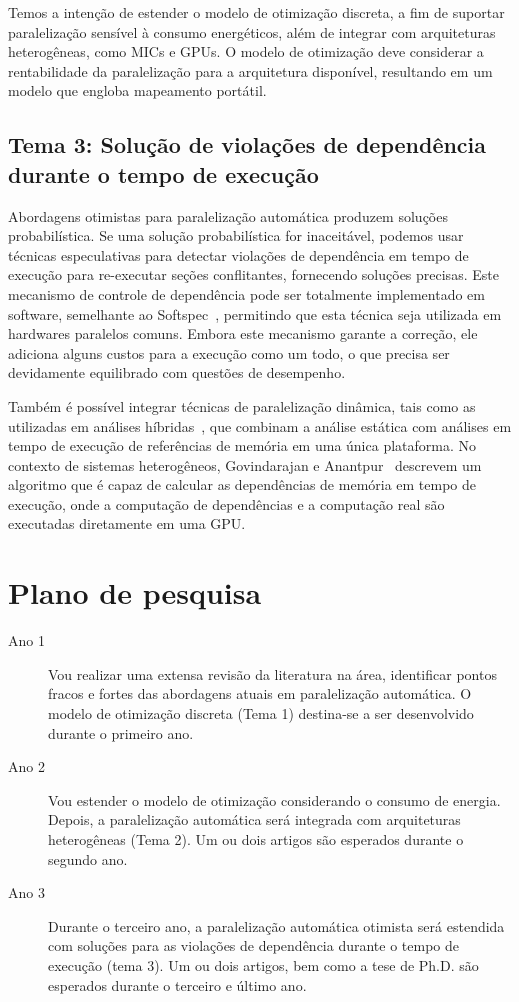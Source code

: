 \documentclass[a4paper,12pt]{article}
\begin{document}
Temos a intenção de estender o modelo de otimização discreta, a fim de suportar paralelização sensível à consumo energéticos, além de integrar com arquiteturas heterogêneas, como MICs e GPUs. O modelo de otimização deve considerar a rentabilidade da paralelização para a arquitetura disponível, resultando em um modelo que engloba mapeamento portátil.

\subsection{Tema 3: Solução de violações de dependência durante o tempo de execução}

Abordagens otimistas para paralelização automática produzem soluções probabilística. Se uma solução probabilística for inaceitável, podemos usar técnicas especulativas para detectar violações de dependência em tempo de execução para re-executar seções conflitantes, fornecendo soluções precisas. Este mecanismo de controle de dependência pode ser totalmente implementado em software, semelhante ao Softspec~\cite{bruening98}, permitindo que esta técnica seja utilizada em hardwares paralelos comuns. Embora este mecanismo garante a correção, ele adiciona alguns custos para a execução como um todo, o que precisa ser devidamente equilibrado com questões de desempenho.

Também é possível integrar técnicas de paralelização dinâmica, tais como as utilizadas em análises híbridas~\cite{rus03}, que combinam a análise estática com análises em tempo de execução de referências de memória em uma única plataforma. No contexto de sistemas heterogêneos, Govindarajan e Anantpur~\cite{govindarajan13} descrevem um algoritmo que é capaz de calcular as dependências de memória em tempo de execução, onde a computação de dependências e a computação real são executadas diretamente em uma GPU.

\section{Plano de pesquisa}

\begin{description}

\item[Ano 1] Vou realizar uma extensa revisão da literatura na área, identificar pontos fracos e fortes das abordagens atuais em paralelização automática. O modelo de otimização discreta (Tema 1) destina-se a ser desenvolvido durante o primeiro ano.

\item[Ano 2] Vou estender o modelo de otimização considerando o consumo de energia. Depois, a paralelização automática será integrada com arquiteturas heterogêneas (Tema 2). Um ou dois artigos são esperados durante o segundo ano.

\item[Ano 3] Durante o terceiro ano, a paralelização automática otimista será estendida com soluções para as violações de dependência durante o tempo de execução (tema 3). Um ou dois artigos, bem como a tese de Ph.D. são esperados durante o terceiro e último ano.

\end{description}
\end{document}
